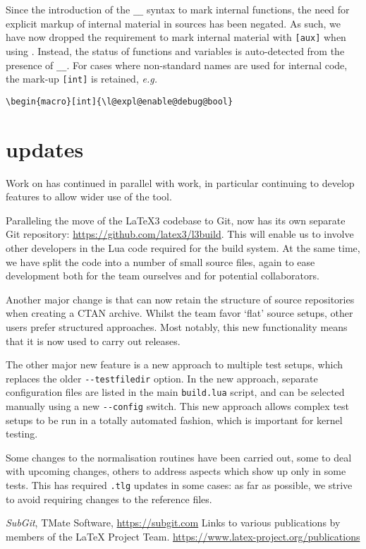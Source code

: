 \documentclass{ltnews}
\begin{document}
Since the introduction of the \verb|__| syntax to mark internal functions, the
need for explicit markup of internal material in sources has been negated.
As such, we have now dropped the requirement to mark internal material with
\verb|[aux]| when using . Instead, the status of functions and
variables is auto-detected from the presence of \verb|__|. For cases where
non-standard names are used for internal code, the mark-up \verb|[int]| is
retained, \emph{e.g.}
\begin{verbatim}
\begin{macro}[int]{\l@expl@enable@debug@bool}
\end{verbatim}

\newpage
\section{ updates}

Work on  has continued in parallel with  work, in
particular continuing to develop features to allow wider use of the tool.

Paralleling the move of the \LaTeX3 codebase to Git,  now has its
own separate Git repository: \url{https://github.com/latex3/l3build}. This will
enable us to involve other developers in the Lua code required for the build
system. At the same time, we have split the code into a number of small source
files, again to ease development both for the team ourselves and for potential
collaborators.

Another major change is that  can now retain the structure of
source repositories when creating a CTAN archive. Whilst the team favor `flat'
source setups, other users prefer structured approaches. Most notably, this
new  functionality means that it is now used to carry out
 releases.

The other major new feature is a new approach to multiple test setups, which
replaces the older \verb|--testfiledir| option. In the new approach, separate
configuration files are listed in the main \verb|build.lua| script, and can be
selected manually using a new \verb|--config| switch. This new approach allows
complex test setups to be run in a totally automated fashion, which is
important for kernel testing.

Some changes to the normalisation routines have been carried out, some to deal
with upcoming  changes, others to address aspects which show up
only in some tests. This has required \verb|.tlg| updates in some cases: as far
as possible, we strive to avoid requiring changes to the reference files.

\begin{thebibliography}{10}
  \raggedright
    \emph{SubGit}, TMate Software, \url{https://subgit.com}
    Links to various publications by members of the \LaTeX{} Project Team.
    \newblock \url{https://www.latex-project.org/publications}
\end{thebibliography}
\end{document}
